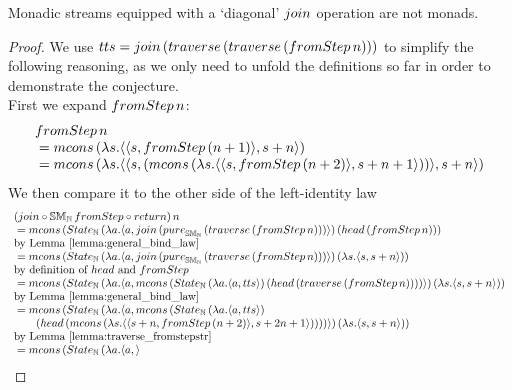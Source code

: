 \begin{theorem}\label{lemma:monad_counterexample}
Monadic streams equipped with a `diagonal' $\join$ operation are not monads.
\end{theorem}
\begin{proof}
We use $tts = \join\, (\traverse\, (\traverse\, (\fromstepstr\, n)))$ to simplify the following reasoning, as we only need to unfold the definitions so far in order to demonstrate the conjecture. \\

First we expand $\fromstepstr\, n$:
$$
\begin{array}{ll}
\fromstepstr\, n \\
{}= \mcons\, (\lambda s. \pair{\pair{s}{\fromstepstr\, (n + 1)}}{s + n})\\
{}= \mcons\, (\lambda s. \pair{\pair{s}{(\mcons\, (\lambda s. \pair{\pair{s}{\fromstepstr\, (n + 2)}}{s + n + 1}))}}{s + n}) \\
\end{array} 
$$
We then compare it to the other side of the left-identity law
$$
\begin{array}{ll}
(\join \comp  \stmon{\nat}\, \fromstepstr \comp \return)\, n \\
{}= \mcons\, (\state_{\nat} \,(\lambda a . \pair{a}{\join\, (\apure_{\stmon{\nat}}\, (\traverse\, (\fromstepstr\, n)))})\, (\head\, (\fromstepstr\, n))) \\
 \mbox{by Lemma \ref{lemma:general_bind_law}}  \\
{}= \mcons\, (\state_{\nat}\,(\lambda a . \pair{a}{\join\, (\apure_{\stmon{\nat}}\,(\traverse\, (\fromstepstr\, n)))})\, (\lambda s. \pair{s}{s + n})) \\
 \mbox{by definition of } \head \mbox{ and } \fromstepstr \\
{}= \mcons\, (\state_{\nat}\,(\lambda a . \pair{a}{  
\mcons\, (\state_{\nat} \,(\lambda a . \pair{a}{tts})\, (\head\, (\traverse\, (\fromstepstr\, n))))
})\, (\lambda s. \pair{s}{s + n})) \\
 \mbox{by Lemma \ref{lemma:general_bind_law}}\\
{}= \mcons\, (\state_{\nat}\,(\lambda a . \pair{a}{  
\mcons\, (\state_{\nat} \,(\lambda a . \pair{a}{tts})\, \\\qquad(\head\, (\mcons\, (\lambda s . \pair{\pair{s+n}{\fromstepstr\, (n + 2)}}{s + 2n + 1}))))
})\, (\lambda s. \pair{s}{s + n})) \\
 \mbox{by Lemma \ref{lemma:traverse_fromstepstr}}\\
{}=  \mcons\, (\state_{\nat}\,(\lambda a . \pair{a}{  
}
\end{array}$$
\end{proof}
